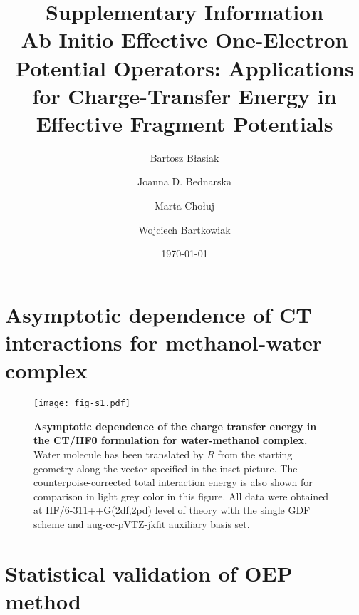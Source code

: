 


\title{Supplementary Information\\Ab Initio Effective One-Electron Potential Operators:
Applications for Charge-Transfer Energy in Effective Fragment Potentials}

\author{Bartosz B{\l}asiak}

\author{Joanna D. Bednarska}
\author{Marta Cho{\l}uj} 
\author{Wojciech Bartkowiak}


\date{\today}

\pacs{}

\maketitle

\tableofcontents

\section{Asymptotic dependence of CT interactions for methanol-water complex}

%
\begin{figure}[h]
\texttt{[image: fig-s1.pdf]}
\caption{\label{f:fig-s1} {\bf Asymptotic dependence of the charge transfer energy
in the CT/HF0 formulation for water-methanol complex.} 
Water molecule has been translated by $R$ from the starting geometry
along the vector specified in the inset picture.
The counterpoise\hyp{}corrected total interaction energy
is also shown for comparison in light grey color in this figure.
All data were obtained at HF/6-311++G(2df,2pd) level of theory
with the single GDF scheme and aug-cc-pVTZ-jkfit auxiliary basis set.
} 
\end{figure}
%


\section{Statistical validation of OEP method}




